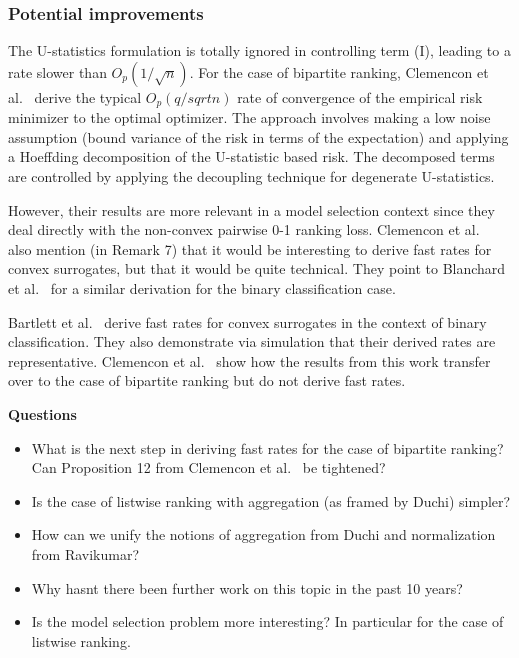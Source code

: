 \documentclass[a4paper,10pt]{article}
\begin{document}
\subsubsection{Potential improvements}
The U-statistics formulation is totally ignored in controlling term
(I), leading to a rate slower than \(O_p(1/\sqrt n)\). For the case of
bipartite ranking, Clemencon et
al.~\cite{clemencon-2008-ranking-rates} derive the typical \(O_p(q/sqrt n)\) rate of
convergence of the empirical risk minimizer to the optimal
optimizer. The approach involves making a low noise assumption (bound
variance of the risk in terms of the expectation) and applying a
Hoeffding decomposition of the U-statistic based risk. The decomposed
terms are controlled by applying the decoupling technique for
degenerate U-statistics.

However, their results are more relevant in a
model selection context since they deal directly with the non-convex
pairwise 0-1 ranking loss. Clemencon et
al.~\cite{clemencon-2008-ranking-rates} also mention (in Remark 7)
that it would be interesting to derive fast rates for convex
surrogates, but that it would be quite technical. They point to
Blanchard et al.~\cite{blanchard-2003-rates} for a similar derivation
for the binary classification case.

Bartlett et al.~\cite{bartlett-2006-risk} derive fast rates for convex
surrogates in the context of binary classification. They also
demonstrate via simulation that their derived rates are
representative. Clemencon et al.~\cite{clemencon-2008-ranking-rates}
show how the results from this work transfer over to the case of
bipartite ranking but do not derive fast rates.

\textbf{Questions}

\begin{itemize}
  \item What is the next step in deriving fast rates for the case of bipartite ranking? Can Proposition 12 from Clemencon et al.~\cite{clemencon-2008-ranking-rates} be tightened?
  \item Is the case of listwise ranking with aggregation (as framed by Duchi) simpler?
  \item How can we unify the notions of aggregation from Duchi and normalization from Ravikumar?
  \item Why hasnt there been further work on this topic in the past 10 years?
  \item Is the model selection problem more interesting? In particular for the case of listwise ranking.
\end{itemize}

{}
\end{document}
